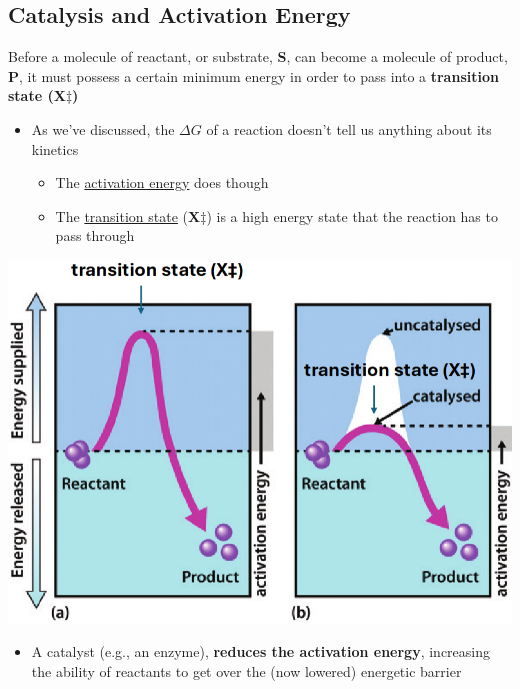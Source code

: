 \documentclass[10pt]{article}
\begin{document}
\subsection*{Catalysis and Activation Energy}
Before a molecule of reactant, or substrate, \textbf{S}, can become a molecule of product, \textbf{P}, it must possess a certain minimum energy in order to pass into a \textbf{transition state (X$\ddagger$)}
\begin{itemize}
    \item As we've discussed, the $\Delta G$ of a reaction doesn't tell us anything about its kinetics
    \begin{itemize}
        \item The \underline{activation energy} does though
        \item The \underline{transition state} (\textbf{X$\ddagger$}) is a high energy state that the reaction has to pass through
    \end{itemize}
\end{itemize}
\begin{center}
    \includegraphics*[scale=0.5]{L1_3.png}
\end{center}
\begin{itemize}
    \item A catalyst (e.g., an enzyme), \textbf{reduces the activation energy}, increasing the ability of reactants to get over the (now lowered) energetic barrier
\end{itemize}
\end{document}
